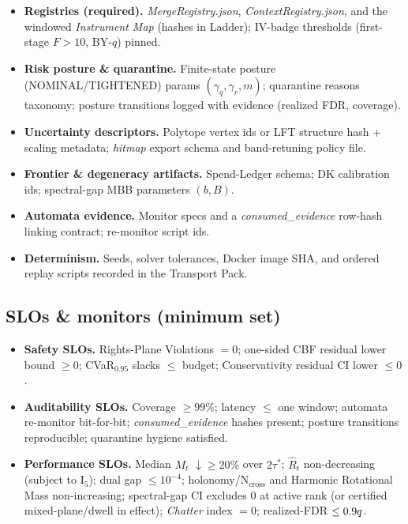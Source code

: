 \begin{itemize}[leftmargin=*]
\item \textbf{Registries (required).} \emph{MergeRegistry.json}, \emph{ContextRegistry.json}, and the windowed \emph{Instrument Map} (hashes in Ladder); IV-badge thresholds (first-stage $F>10$, BY-$q$) pinned.
\item \textbf{Risk posture \& quarantine.} Finite-state posture (NOMINAL/TIGHTENED) params $(\gamma_q,\gamma_r,m)$; quarantine reasons taxonomy; posture transitions logged with evidence (realized FDR, coverage).
\item \textbf{Uncertainty descriptors.} Polytope vertex ids or LFT structure hash + scaling metadata; \emph{hitmap} export schema and band-retuning policy file.
\item \textbf{Frontier \& degeneracy artifacts.} Spend-Ledger schema; DK calibration ids; spectral-gap MBB parameters $(b,B)$.
\item \textbf{Automata evidence.} Monitor specs and a \emph{consumed\_evidence} row-hash linking contract; re-monitor script ids.
\item \textbf{Determinism.} Seeds, solver tolerances, Docker image SHA, and ordered replay scripts recorded in the Transport Pack.
\end{itemize}

\subsection*{SLOs \& monitors (minimum set)}

\begin{itemize}[leftmargin=*]
\item \textbf{Safety SLOs.} Rights-Plane Violations $=0$; one-sided CBF residual lower bound $\ge 0$; CVaR$_{0.95}$ slacks $\le$ budget; \textsf{Conservativity} residual CI lower $\le 0$.
\item \textbf{Auditability SLOs.} Coverage $\ge 99\%$; latency $\le$ one window; automata re-monitor bit-for-bit; \emph{consumed\_evidence} hashes present; posture transitions reproducible; quarantine hygiene satisfied.
\item \textbf{Performance SLOs.} Median $M_t$ $\downarrow\ge 20\%$ over $2\tau^\ast$; $\widehat R_t$ non-decreasing (subject to I$_5$); dual gap $\le 10^{-4}$; holonomy/N$_{\mathrm{cross}}$ and Harmonic Rotational Mass non-increasing; spectral-gap CI excludes $0$ at active rank (or certified mixed-plane/dwell in effect); \emph{Chatter} index $=0$; realized-FDR $\le 0.9q$.
\end{itemize}


